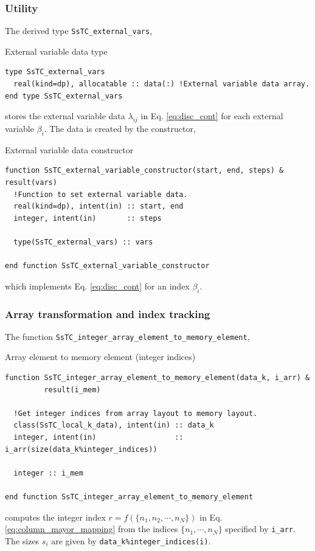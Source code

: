 \documentclass[10pt,a4paper]{article}
\begin{document}
\subsubsection{Utility}
The derived type \verb|SsTC_external_vars|,
\begin{codebox}{External variable data type}
\begin{lstlisting}[caption={Derived type ``external variables".},captionpos=b]
type SsTC_external_vars
  real(kind=dp), allocatable :: data(:) !External variable data array.
end type SsTC_external_vars
\end{lstlisting}
\end{codebox}
stores the external variable data $\lambda_{ij}$ in Eq. \eqref{eq:disc_cont} for each external variable $\beta_i$. The data is created by the constructor,
\begin{codebox}{External variable data constructor}
\begin{lstlisting}[caption={Interface of ``external variable constructor".},captionpos=b]
function SsTC_external_variable_constructor(start, end, steps) &
result(vars)
  !Function to set external variable data.
  real(kind=dp), intent(in) :: start, end
  integer, intent(in)       :: steps

  type(SsTC_external_vars) :: vars

end function SsTC_external_variable_constructor
\end{lstlisting}
\end{codebox}
which implements Eq. \eqref{eq:disc_cont} for an index $\beta_i$.
\subsubsection{Array transformation and index tracking}

The function \verb|SsTC_integer_array_element_to_memory_element|,
\begin{codebox}{Array element to memory element (integer indices)}
\begin{lstlisting}[caption={Interface of ``integer array element to memory element".},captionpos=b]
function SsTC_integer_array_element_to_memory_element(data_k, i_arr) &
         result(i_mem)

  !Get integer indices from array layout to memory layout.
  class(SsTC_local_k_data), intent(in) :: data_k
  integer, intent(in)                  :: i_arr(size(data_k%integer_indices))

  integer :: i_mem

end function SsTC_integer_array_element_to_memory_element
\end{lstlisting}
\end{codebox}
computes the integer index $r = f(\{n_1, n_2, \cdots, n_N\})$ in Eq. \eqref{eq:column_mayor_mapping} from the indices $\{n_1, \cdots, n_N\}$ specified by \verb|i_arr|. The sizes $s_i$ are given by \verb|data_k%integer_indices(i)|.
\end{document}
